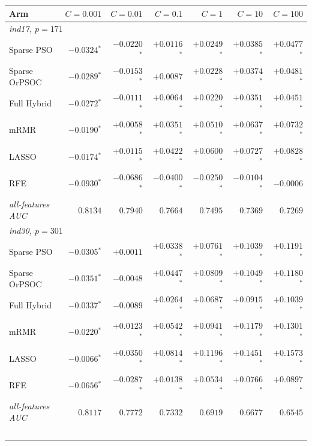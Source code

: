 \begin{table}[htbp]
    \centering
    \small\setlength{\tabcolsep}{4pt}
    \begin{tabular}{lrrrrrr}
    \hline
    Arm & $C = 0.001$ & $C = 0.01$ & $C = 0.1$ & $C = 1$ & $C = 10$ & $C = 100$ \\
    \hline
    \multicolumn{7}{l}{\textit{ind17, $p = 171$}} \\
    Sparse PSO & $-0.0324$$^{*}$ & $-0.0220$$^{*}$ & $+0.0116$$^{*}$ & $+0.0249$$^{*}$ & $+0.0385$$^{*}$ & $+0.0477$$^{*}$ \\
    Sparse OrPSOC & $-0.0289$$^{*}$ & $-0.0153$$^{*}$ & $+0.0087$ & $+0.0228$$^{*}$ & $+0.0374$$^{*}$ & $+0.0481$$^{*}$ \\
    Full Hybrid & $-0.0272$$^{*}$ & $-0.0111$$^{*}$ & $+0.0064$$^{*}$ & $+0.0220$$^{*}$ & $+0.0351$$^{*}$ & $+0.0451$$^{*}$ \\
    mRMR & $-0.0190$$^{*}$ & $+0.0058$$^{*}$ & $+0.0351$$^{*}$ & $+0.0510$$^{*}$ & $+0.0637$$^{*}$ & $+0.0732$$^{*}$ \\
    LASSO & $-0.0174$$^{*}$ & $+0.0115$$^{*}$ & $+0.0422$$^{*}$ & $+0.0600$$^{*}$ & $+0.0727$$^{*}$ & $+0.0828$$^{*}$ \\
    RFE & $-0.0930$$^{*}$ & $-0.0686$$^{*}$ & $-0.0400$$^{*}$ & $-0.0250$$^{*}$ & $-0.0104$$^{*}$ & $-0.0006$ \\
    \textit{all-features AUC} & $0.8134$ & $0.7940$ & $0.7664$ & $0.7495$ & $0.7369$ & $0.7269$ \\
    \hline
    \multicolumn{7}{l}{\textit{ind30, $p = 301$}} \\
    Sparse PSO & $-0.0305$$^{*}$ & $+0.0011$ & $+0.0338$$^{*}$ & $+0.0761$$^{*}$ & $+0.1039$$^{*}$ & $+0.1191$$^{*}$ \\
    Sparse OrPSOC & $-0.0351$$^{*}$ & $-0.0048$ & $+0.0447$$^{*}$ & $+0.0809$$^{*}$ & $+0.1049$$^{*}$ & $+0.1180$$^{*}$ \\
    Full Hybrid & $-0.0337$$^{*}$ & $-0.0089$ & $+0.0264$$^{*}$ & $+0.0687$$^{*}$ & $+0.0915$$^{*}$ & $+0.1039$$^{*}$ \\
    mRMR & $-0.0220$$^{*}$ & $+0.0123$$^{*}$ & $+0.0542$$^{*}$ & $+0.0941$$^{*}$ & $+0.1179$$^{*}$ & $+0.1301$$^{*}$ \\
    LASSO & $-0.0066$$^{*}$ & $+0.0350$$^{*}$ & $+0.0814$$^{*}$ & $+0.1196$$^{*}$ & $+0.1451$$^{*}$ & $+0.1573$$^{*}$ \\
    RFE & $-0.0656$$^{*}$ & $-0.0287$$^{*}$ & $+0.0138$$^{*}$ & $+0.0534$$^{*}$ & $+0.0766$$^{*}$ & $+0.0897$$^{*}$ \\
    \textit{all-features AUC} & $0.8117$ & $0.7772$ & $0.7332$ & $0.6919$ & $0.6677$ & $0.6545$ \\
$$
\end{tabular}
\end{table}
